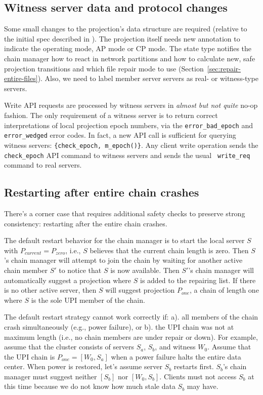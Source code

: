 \documentclass[preprint,10pt]{sigplanconf}
\begin{document}
\subsection{Witness server data and protocol changes}

Some small changes to the projection's data structure
are required (relative to the initial spec described in
\cite{machi-design}).  The projection itself
needs new annotation to indicate the operating mode, AP mode or CP
mode.  The state type notifies the chain manager how to
react in network partitions and how to calculate new, safe projection
transitions and which file repair mode to use
(Section~\ref{sec:repair-entire-files}).
Also, we need to label member server servers as real- or
witness-type servers.

Write API requests are processed by witness servers in {\em almost but
  not quite} no-op fashion.  The only requirement of a witness server
is to return correct interpretations of local projection epoch
numbers, via the {\tt error\_bad\_epoch} and {\tt error\_wedged} error
codes.  In fact, a new API call is sufficient for querying witness
servers: {\tt \{check\_epoch, m\_epoch()\}}.
Any client write operation sends the {\tt
  check\_\-epoch} API command to witness servers and sends the usual {\tt
  write\_\-req} command to real servers.

\subsection{Restarting after entire chain crashes}

There's a corner case that requires additional safety checks to
preserve strong consistency: restarting after the entire chain crashes.

The default restart behavior for the chain manager is to start the
local server $S$ with $P_{current} = P_{zero}$, i.e., $S$
believes that the current chain length is zero.  Then $S$'s chain
manager will attempt to join the chain by waiting for another active
chain member $S'$ to notice that $S$ is now available.  Then $S'$'s
chain manager will automatically suggest a projection where $S$ is
added to the repairing list.  If there is no other active server,
then $S$ will suggest projection $P_{one}$, a chain of length one
where $S$ is the sole UPI member of the chain.

The default restart strategy cannot work correctly if: a). all members
of the chain crash simultaneously (e.g., power failure), or b). the UPI
chain was not at maximum length (i.e., no chain members are under
repair or down).  For example, assume that the cluster consists of
servers $S_a$, $S_b$, and witness $W_0$.  Assume that the
UPI chain is $P_{one} = [W_0,S_a]$ when a power
failure halts the entire data center.  When power is
restored, let's assume server $S_b$ restarts first.
$S_b$'s chain manager must suggest
neither $[S_b]$ nor $[W_0,S_b]$.  Clients must not access $S_b$ at
this time because we do not know how much stale data $S_b$ may have.
\end{document}
